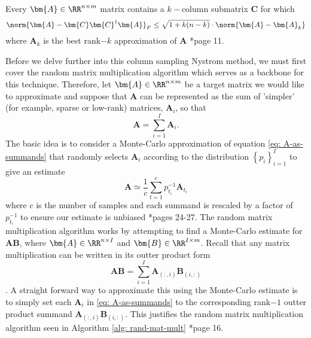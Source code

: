 \begin{thm} \label{lem: best-col-sel}
    Every $\bm{A} \in \RR^{n \times m}$ matrix contains a $k-$column submatrix $\bm{C}$ for which
    \[
        \norm{\bm{A} - \bm{C} \bm{C}^{\dagger} \bm{A}}_{F} \leq \sqrt{1 + k(n-k)} \cdot \norm{\bm{A} - \bm{A}_{k}}
    \]
    where $\bm{A}_k$ is the best rank$-k$ approximation of $\bm{A}$ \cite{halko2011finding}*{page 11}.
\end{thm}
Before we delve further into this column sampling Nystrom method, we must first cover the random matrix multiplication algorithm which serves as a backbone for this technique. Therefore, let $\bm{A} \in \RR^{n \times m}$ be a target matrix we would like to approximate and suppose that $\bm{A}$ can be represented as the sum of 'simpler' (for example, sparse or low-rank) matrices, $\bm{A}_i$, so that
\begin{equation} \label{eq: A-as-summands}
    \bm{A} = \sum_{i=1}^{I} \bm{A}_i .
\end{equation}
The basic idea is to consider a Monte-Carlo approximation of equation \ref{eq: A-as-summands} that randomly selects $\bm{A}_i$ according to the distribution $\left\{ p_i \right\}_{i=1}^{I}$ to give an estimate
\begin{equation}
    \bm{A} \simeq \frac{1}{c} \sum_{t=1}^{c} p_{t_i}^{-1} \bm{A}_{t_i}
\end{equation}
where $c$ is the number of samples and each summand is rescaled by a factor of $p_{t_i}^{-1}$ to ensure our estimate is unbiased \cite{martinsson2021randomized}*{pages 24-27}. The random matrix multiplication algorithm works by attempting to find a Monte-Carlo estimate for $\bm{A}\bm{B}$, where $\bm{A} \in \RR^{n \times I}$ and $\bm{B} \in \RR^{I \times m}$. Recall that any matrix multiplication can be written in its outter product form
\begin{equation*}
    \bm{A} \bm{B} = \sum_{i=1}^{I} \bm{A}_{(:,i)} \bm{B}_{(i,:)}
\end{equation*}
\cites{Roosta2020, doi:10.1137/S0097539704442684}. A straight forward way to approximate this using the Monte-Carlo estimate is to simply set each $\bm{A}_i$ in \ref{eq: A-as-summands} to the corresponding rank$-1$ outter product summand $\bm{A}_{(:,i)} \bm{B}_{(i,:)}$. This justifies the random matrix multiplication algorithm seen in Algorithm \ref{alg: rand-mat-mult} \cite{drineas2017lectures}*{page 16}.

